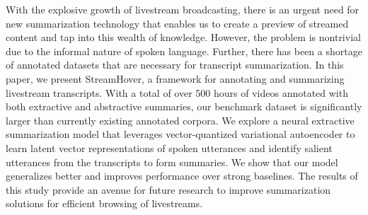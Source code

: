 With the explosive growth of livestream broadcasting, there is an urgent need for new summarization technology that enables us to create a preview of streamed content and tap into this wealth of knowledge. However, the problem is nontrivial due to the informal nature of spoken language. Further, there has been a shortage of annotated datasets that are necessary for transcript summarization. In this paper, we present StreamHover, a framework for annotating and summarizing livestream transcripts. With a total of over 500 hours of videos annotated with both extractive and abstractive summaries, our benchmark dataset is significantly larger than currently existing annotated corpora. We explore a neural extractive summarization model that leverages vector-quantized variational autoencoder to learn latent vector representations of spoken utterances and identify salient utterances from the transcripts to form summaries. We show that our model generalizes better and improves performance over strong baselines. The results of this study provide an avenue for future research to improve summarization solutions for efficient browsing of livestreams.
